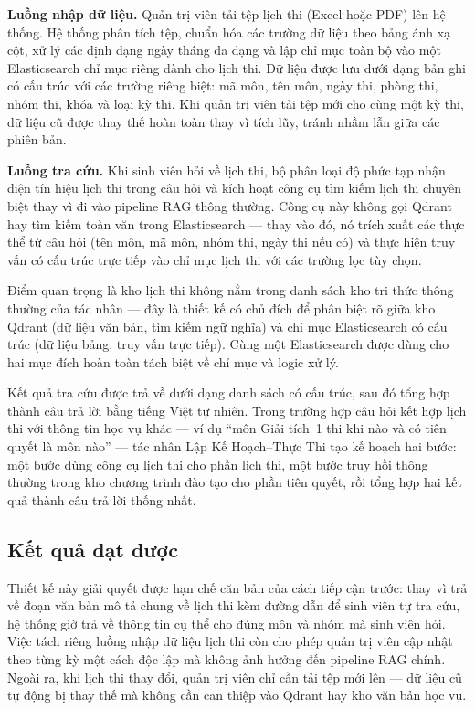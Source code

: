 \documentclass[../DoAn.tex]{subfiles}
\begin{document}
\textbf{Luồng nhập dữ liệu.} Quản trị viên tải tệp lịch thi (Excel hoặc PDF)
lên hệ thống. Hệ thống phân tích tệp, chuẩn hóa các trường dữ liệu theo bảng
ánh xạ cột, xử lý các định dạng ngày tháng đa dạng và lập chỉ mục toàn bộ vào
một Elasticsearch chỉ mục riêng dành cho lịch thi. Dữ liệu được lưu dưới dạng
bản ghi có cấu trúc với các trường riêng biệt: mã môn, tên môn, ngày thi, phòng
thi, nhóm thi, khóa và loại kỳ thi. Khi quản trị viên tải tệp mới cho cùng một
kỳ thi, dữ liệu cũ được thay thế hoàn toàn thay vì tích lũy, tránh nhầm lẫn
giữa các phiên bản.

\textbf{Luồng tra cứu.} Khi sinh viên hỏi về lịch thi, bộ phân loại độ phức
tạp nhận diện tín hiệu lịch thi trong câu hỏi và kích hoạt công cụ tìm kiếm
lịch thi chuyên biệt thay vì đi vào pipeline RAG thông thường. Công cụ này không
gọi Qdrant hay tìm kiếm toàn văn trong Elasticsearch --- thay vào đó, nó trích
xuất các thực thể từ câu hỏi (tên môn, mã môn, nhóm thi, ngày thi nếu có) và
thực hiện truy vấn có cấu trúc trực tiếp vào chỉ mục lịch thi với các trường
lọc tùy chọn.

Điểm quan trọng là kho lịch thi không nằm trong danh sách kho tri thức thông
thường của tác nhân --- đây là thiết kế có chủ đích để phân biệt rõ giữa kho
Qdrant (dữ liệu văn bản, tìm kiếm ngữ nghĩa) và chỉ mục Elasticsearch có cấu
trúc (dữ liệu bảng, truy vấn trực tiếp). Cùng một Elasticsearch được dùng cho
hai mục đích hoàn toàn tách biệt về chỉ mục và logic xử lý.

Kết quả tra cứu được trả về dưới dạng danh sách có cấu trúc, sau đó tổng hợp
thành câu trả lời bằng tiếng Việt tự nhiên. Trong trường hợp câu hỏi kết hợp
lịch thi với thông tin học vụ khác --- ví dụ ``môn Giải tích~1 thi khi nào và
có tiên quyết là môn nào'' --- tác nhân Lập Kế Hoạch--Thực Thi tạo kế hoạch
hai bước: một bước dùng công cụ lịch thi cho phần lịch thi, một bước truy hồi
thông thường trong kho chương trình đào tạo cho phần tiên quyết, rồi tổng hợp
hai kết quả thành câu trả lời thống nhất.

\subsection{Kết quả đạt được}

Thiết kế này giải quyết được hạn chế căn bản của cách tiếp cận trước: thay vì
trả về đoạn văn bản mô tả chung về lịch thi kèm đường dẫn để sinh viên tự tra
cứu, hệ thống giờ trả về thông tin cụ thể cho đúng môn và nhóm mà sinh viên
hỏi. Việc tách riêng luồng nhập dữ liệu lịch thi còn cho phép quản trị viên cập
nhật theo từng kỳ một cách độc lập mà không ảnh hưởng đến pipeline RAG chính.
Ngoài ra, khi lịch thi thay đổi, quản trị viên chỉ cần tải tệp mới lên --- dữ
liệu cũ tự động bị thay thế mà không cần can thiệp vào Qdrant hay kho văn bản
học vụ.
\end{document}
